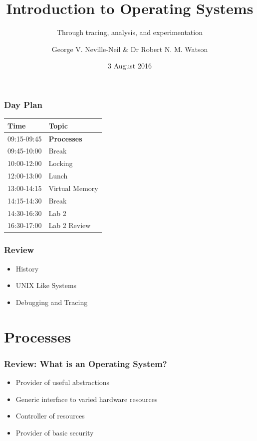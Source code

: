 \documentclass[pdftex]{beamer} %
\begin{document}

\title{Introduction to Operating Systems}
\subtitle{Through tracing, analysis, and experimentation}
\author{George V. Neville-Neil \& Dr Robert N. M. Watson}
\date{3 August 2016}

\begin{frame}
  \titlepage
\end{frame}

\begin{frame}[fragile]
  \frametitle{Day Plan}
  \begin{tabular*}{1.0\linewidth}{l|l}
    Time & Topic \\
    \hline
    09:15-09:45 & \textbf{Processes} \\
    09:45-10:00 & Break \\
    10:00-12:00 & Locking \\
    12:00-13:00 & Lunch \\
    13:00-14:15 & Virtual Memory \\
    14:15-14:30 & Break \\
    14:30-16:30 & Lab 2 \\
    16:30-17:00 & Lab 2 Review
  \end{tabular*}
\end{frame}


\begin{frame}
  \frametitle{Review}
  \begin{itemize}
  \item History
  \item UNIX Like Systems
  \item Debugging and Tracing
  \end{itemize}
\end{frame}

\section{Processes}
\label{sec:processes}

\begin{frame}
  \frametitle{Review: What is an Operating System?}
  \begin{itemize}
  \item Provider of useful abstractions
  \item Generic interface to varied hardware resources
  \item Controller of resources
  \item Provider of basic security
  \end{itemize}
\end{frame}
\end{document}
